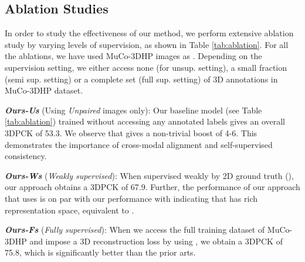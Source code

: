 \documentclass[runningheads]{llncs}
\begin{document}
\begin{table*}[t]
{\begin{tabular}{l|c|c|c|c|c}
    \hline
    \end{tabular}
    }
\end{table*}

\subsection{Ablation Studies}
\label{sec:ablation_studies}
In order to study the effectiveness of our method, we perform extensive ablation study by varying levels of supervision, as shown in Table \ref{tab:ablation}. For all the ablations, we have used MuCo-3DHP images \cite{mehta2018single} as . Depending on the supervision setting, we either access none (for unsup. setting), a small fraction (semi sup. setting) or a complete set (full sup. setting) of 3D annotations in MuCo-3DHP dataset. 

\textbf{\textit{Ours-Us}} (Using \textit{Unpaired} images only): Our baseline model (see Table \ref{tab:ablation}) trained without accessing any annotated labels gives an overall 3DPCK of 53.3.
We observe that  gives a non-trivial boost of 4-6. This demonstrates the importance of cross-modal alignment and self-supervised consistency. 

\textbf{\textit{Ours-Ws}} (\textit{Weakly supervised}): When supervised weakly by 2D ground truth (), our approach obtains a 3DPCK of 67.9. Further, the performance of our approach that uses  is on par with our performance with  indicating that  has rich representation space, equivalent to . 

\textbf{\textit{Ours-Fs}} (\textit{Fully supervised}):  When we access the full training dataset of MuCo-3DHP and impose a 3D reconstruction loss by using , we obtain a 3DPCK of 75.8, which is significantly better than the prior arts.
\end{document}
